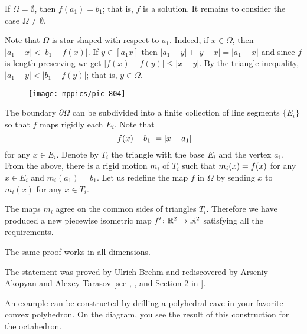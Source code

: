 If $\Omega=\emptyset$,
then $f(a_1)=b_1$; 
that is, $f$ is a solution.
It remains to consider the case $\Omega\ne\emptyset$. 

Note that $\Omega$ is star-shaped with respect to $a_1$.
Indeed, if $x\in \Omega$, then $|a_1-x|<|b_1-f(x)|$.
If $y\in [a_1x]$ then 
$|a_1-y|+|y-x|=|a_1-x|$ and since $f$ is length-preserving we get $|f(x)-f(y)|\le |x-y|$.
By the triangle inequality, 
$|a_1-y|<|b_1-f(y)|$; that is, $y\in\Omega$. 

\begin{wrapfigure}{o}{47 mm}
\vskip-1mm
\centering
\texttt{[image: mppics/pic-804]}
\vskip-1mm
\end{wrapfigure}

The boundary $\partial\Omega$ can be subdivided into a finite collection of line segments $\{E_i\}$
so that $f$ maps rigidly each $E_i$.
Note that 
\[|f(x)\z-b_1|=|x-a_1|\]
for any $x\in E_i$.
Denote by $T_i$ the triangle with the base $E_i$ and the vertex $a_1$.
From the above, there is a rigid motion $m_i$ of $T_i$ such that $m_i(x)\z=f(x)$ for any $x\in E_i$ and $m_i(a_1)=b_1$.
Let us redefine the map $f$ in $\Omega$ by sending $x$ to $m_i(x)$ for any $x\in T_i$.

The maps $m_i$ agree on the common sides of triangles $T_i$.
Therefore we have produced a new piecewise isometric map $f'\colon\mathbb{R}^2\to \mathbb{R}^2$ satisfying all the requirements.
\qeds

The same proof works in all dimensions.

The statement was proved by Ulrich Brehm 
and rediscovered by Arseniy Akopyan and Alexey Tarasov [see , , and Section 2 in ].


An example can be constructed by drilling a polyhedral cave in your favorite convex polyhedron.
On the diagram, you see the result of this construction for the octahedron.

